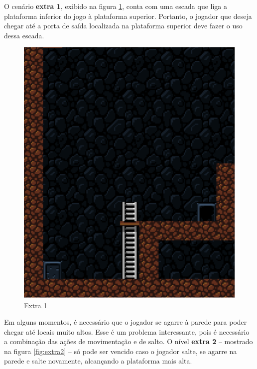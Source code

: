 O cenário \textbf{extra 1}, exibido na figura \ref{fig:extra1}, conta com uma
escada que liga a plataforma inferior do jogo à plataforma superior. Portanto,
o jogador que deseja chegar até a porta de saída localizada na plataforma
superior deve fazer o uso dessa escada.

\begin{figure}[H]
\centering
\includegraphics[width=\textwidth / 2]{fig/levels/extra1.pdf}
\caption{Extra 1}
\label{fig:extra1}
\end{figure}

Em alguns momentos, é necessário que o jogador se agarre à parede para poder
chegar até locais muito altos. Esse é um problema interessante, pois é
necessário a combinação das ações de movimentação e de salto. O nível
\textbf{extra 2} -- mostrado na figura \ref{fig:extra2} -- só pode ser vencido
caso o jogador salte, se agarre na parede e salte novamente, alcançando a
plataforma mais alta.

